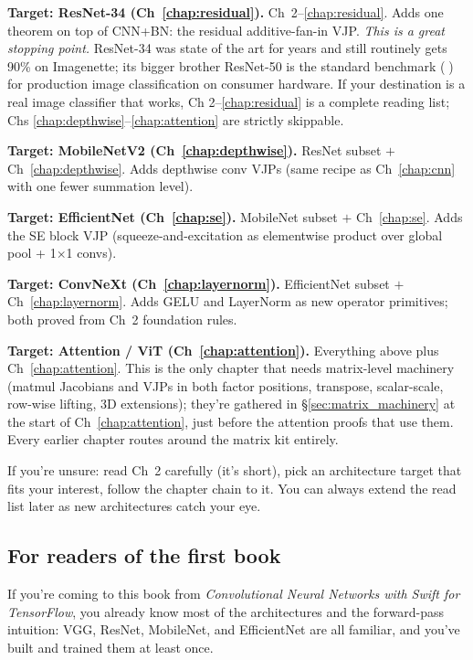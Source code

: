 \textbf{Target: ResNet-34 (Ch~\ref{chap:residual}).} Ch~2--\ref{chap:residual}.
Adds one theorem on top of CNN+BN: the residual additive-fan-in VJP.
\emph{This is a great stopping point.} ResNet-34 was state of the
art for years and still routinely gets 90\% on Imagenette; its
bigger brother ResNet-50 is the standard benchmark (🐐) for
production image classification on consumer hardware. If your
destination is a real image classifier that works, Ch
2--\ref{chap:residual} is a complete reading list; Chs
\ref{chap:depthwise}--\ref{chap:attention} are strictly skippable.

\textbf{Target: MobileNetV2 (Ch~\ref{chap:depthwise}).} ResNet
subset $+$ Ch~\ref{chap:depthwise}. Adds depthwise conv VJPs (same
recipe as Ch~\ref{chap:cnn} with one fewer summation level).

\textbf{Target: EfficientNet (Ch~\ref{chap:se}).} MobileNet subset
$+$ Ch~\ref{chap:se}. Adds the SE block VJP (squeeze-and-excitation
as elementwise product over global pool + 1$\times$1 convs).

\textbf{Target: ConvNeXt (Ch~\ref{chap:layernorm}).} EfficientNet
subset $+$ Ch~\ref{chap:layernorm}. Adds GELU and LayerNorm as new
operator primitives; both proved from Ch~2 foundation rules.

\textbf{Target: Attention / ViT (Ch~\ref{chap:attention}).}
Everything above plus Ch~\ref{chap:attention}. This is the only
chapter that needs matrix-level machinery (matmul Jacobians and
VJPs in both factor positions, transpose, scalar-scale, row-wise
lifting, 3D extensions); they're gathered in
\S\ref{sec:matrix_machinery} at the start of Ch~\ref{chap:attention},
just before the attention proofs that use them. Every earlier
chapter routes around the matrix kit entirely.

If you're unsure: read Ch~2 carefully (it's short), pick an
architecture target that fits your interest, follow the chapter
chain to it. You can always extend the read list later as new
architectures catch your eye.

\subsection*{For readers of the first book}

If you're coming to this book from \emph{Convolutional Neural
Networks with Swift for TensorFlow}, you already know most of the
architectures and the forward-pass intuition: VGG, ResNet,
MobileNet, and EfficientNet are all familiar, and you've built and
trained them at least once.

